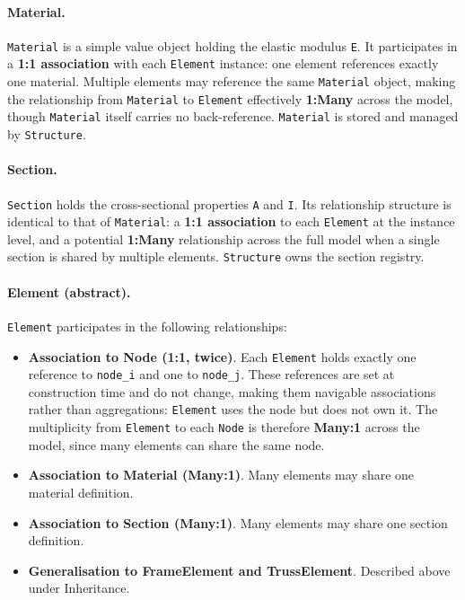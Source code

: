 \paragraph{Material.}
\texttt{Material} is a simple value object holding the elastic modulus
\texttt{E}.
It participates in a \textbf{1:1 association} with each \texttt{Element}
instance: one element references exactly one material.
Multiple elements may reference the same \texttt{Material} object, making
the relationship from \texttt{Material} to \texttt{Element} effectively
\textbf{1:Many} across the model, though \texttt{Material} itself carries
no back-reference.
\texttt{Material} is stored and managed by \texttt{Structure}.

\paragraph{Section.}
\texttt{Section} holds the cross-sectional properties \texttt{A} and
\texttt{I}.
Its relationship structure is identical to that of \texttt{Material}: a
\textbf{1:1 association} to each \texttt{Element} at the instance level,
and a potential \textbf{1:Many} relationship across the full model when
a single section is shared by multiple elements.
\texttt{Structure} owns the section registry.

\paragraph{Element (abstract).}
\texttt{Element} participates in the following relationships:

\begin{itemize}
  \item \textbf{Association to Node (1:1, twice)}.
  Each \texttt{Element} holds exactly one reference to \texttt{node\_i}
  and one to \texttt{node\_j}.
  These references are set at construction time and do not change,
  making them navigable associations rather than aggregations:
  \texttt{Element} uses the node but does not own it.
  The multiplicity from \texttt{Element} to each \texttt{Node} is
  therefore \textbf{Many:1} across the model, since many elements can
  share the same node.

  \item \textbf{Association to Material (Many:1)}.
  Many elements may share one material definition.

  \item \textbf{Association to Section (Many:1)}.
  Many elements may share one section definition.

  \item \textbf{Generalisation to FrameElement and TrussElement}.
  Described above under Inheritance.
\end{itemize}

